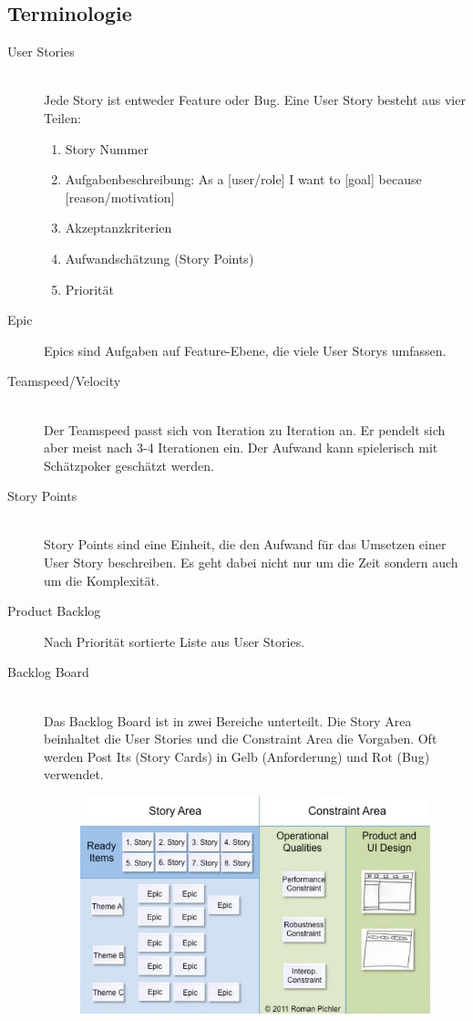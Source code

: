 \subsection{Terminologie}
\begin{description}
	\item[User Stories] \hfill \\
	Jede Story ist entweder Feature oder Bug. Eine User Story besteht aus vier Teilen:
	\begin{enumerate}
		\item Story Nummer
		\item Aufgabenbeschreibung: As a [user/role] I want to [goal] because [reason/motivation]
		\item Akzeptanzkriterien
		\item Aufwandschätzung (Story Points)
		\item Priorität
	\end{enumerate}
	\item[Epic]
	Epics sind Aufgaben auf Feature-Ebene, die viele User Storys umfassen.
	\item[Teamspeed/Velocity] \hfill \\
	Der Teamspeed passt sich von Iteration zu Iteration an. Er pendelt sich aber meist nach 3-4 Iterationen ein. Der Aufwand kann spielerisch mit Schätzpoker geschätzt werden.
	\item[Story Points] \hfill \\ 
	Story Points sind eine Einheit, die den Aufwand für das Umsetzen einer User Story beschreiben. Es geht dabei nicht nur um die Zeit sondern auch um die Komplexität.
	\newpage
	\item[Product Backlog] Nach Priorität sortierte Liste aus User Stories.
	\item[Backlog Board] \hfill \\
	Das Backlog Board ist in zwei Bereiche unterteilt. Die Story Area beinhaltet die User Stories und die Constraint Area die Vorgaben. Oft werden Post Its (Story Cards) in Gelb (Anforderung) und Rot (Bug) verwendet. 
	\begin{figure}[h!]
		\centering
		\includegraphics[width=0.5\linewidth]{images/productbacklog}

\end{figure}
\end{description}
